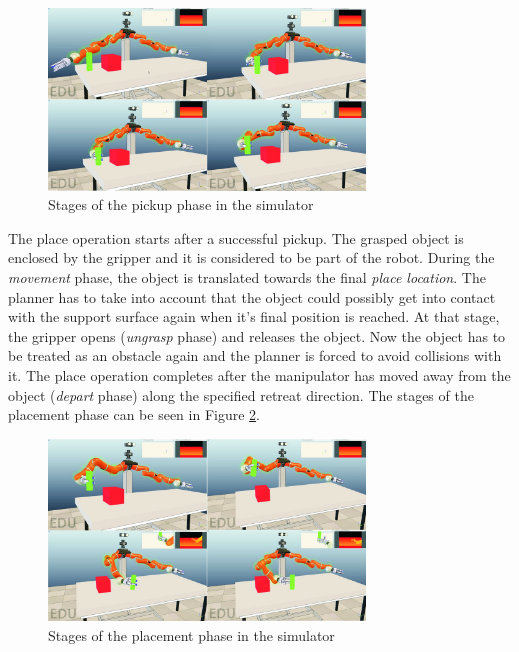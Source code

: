 \begin{figure}[h]
	\centering
  	\includegraphics[width=0.75\textwidth]{images/pickup.jpg}
	\caption{Stages of the pickup phase in the simulator}
	\label{fig:pickup}
\end{figure}

The place operation starts after a successful pickup. The grasped object is enclosed by the gripper and it is considered to be part of the robot. During the \emph{movement} phase, the object is translated towards the final \emph{place location}. The planner has to take into account that the object could possibly get into contact with the support surface again when it's final position is reached. At that stage, the gripper opens (\emph{ungrasp} phase) and releases the object. Now the object has to be treated as an obstacle again and the planner is forced to avoid collisions with it. The place operation completes after the manipulator has moved away from the object (\emph{depart} phase) along the specified retreat direction. The stages of the placement phase can be seen in Figure \ref{fig:placement}.

\begin{figure}[h]
	\centering
  	\includegraphics[width=0.75\textwidth]{images/placement.jpg}
	\caption{Stages of the placement phase in the simulator}
	\label{fig:placement}
\end{figure}


